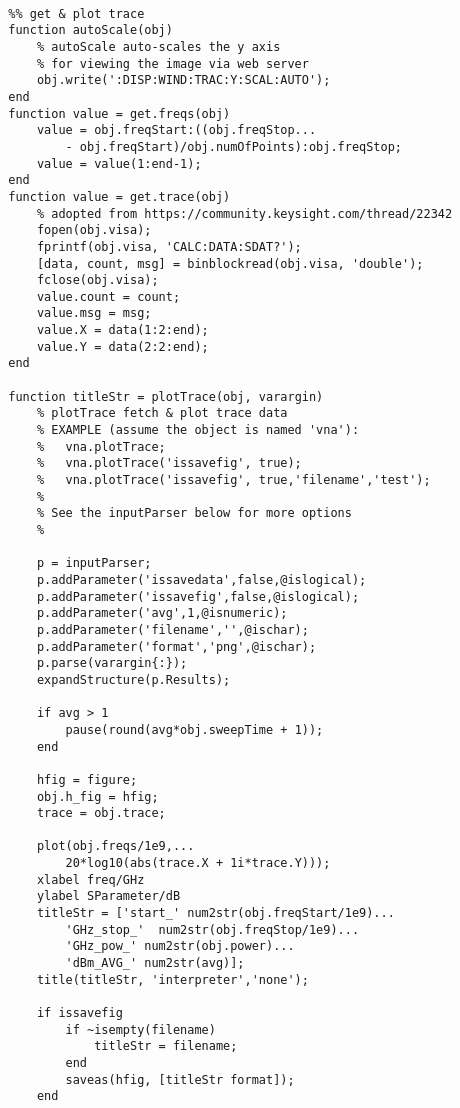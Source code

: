 \begin{lstlisting}
        
        %% get & plot trace
        function autoScale(obj)
            % autoScale auto-scales the y axis
            % for viewing the image via web server
            obj.write(':DISP:WIND:TRAC:Y:SCAL:AUTO');
        end
        function value = get.freqs(obj)            
            value = obj.freqStart:((obj.freqStop...
                - obj.freqStart)/obj.numOfPoints):obj.freqStop;
            value = value(1:end-1);
        end
        function value = get.trace(obj)
            % adopted from https://community.keysight.com/thread/22342
            fopen(obj.visa);
            fprintf(obj.visa, 'CALC:DATA:SDAT?'); 
            [data, count, msg] = binblockread(obj.visa, 'double'); 
            fclose(obj.visa);
            value.count = count;
            value.msg = msg;
            value.X = data(1:2:end); 
            value.Y = data(2:2:end);
        end
        
        function titleStr = plotTrace(obj, varargin)
            % plotTrace fetch & plot trace data
            % EXAMPLE (assume the object is named 'vna'):
            %   vna.plotTrace;
            %   vna.plotTrace('issavefig', true);
            %   vna.plotTrace('issavefig', true,'filename','test');
            %
            % See the inputParser below for more options
            %   
            
            p = inputParser;
            p.addParameter('issavedata',false,@islogical);
            p.addParameter('issavefig',false,@islogical);
            p.addParameter('avg',1,@isnumeric);
            p.addParameter('filename','',@ischar);
            p.addParameter('format','png',@ischar);
            p.parse(varargin{:});
            expandStructure(p.Results);
            
            if avg > 1
                pause(round(avg*obj.sweepTime + 1));
            end
            
            hfig = figure;
            obj.h_fig = hfig;
            trace = obj.trace;
            
            plot(obj.freqs/1e9,...
                20*log10(abs(trace.X + 1i*trace.Y)));
            xlabel freq/GHz
            ylabel SParameter/dB
            titleStr = ['start_' num2str(obj.freqStart/1e9)...
                'GHz_stop_'  num2str(obj.freqStop/1e9)...
                'GHz_pow_' num2str(obj.power)...
                'dBm_AVG_' num2str(avg)];
            title(titleStr, 'interpreter','none');
            
            if issavefig
                if ~isempty(filename)
                    titleStr = filename;
                end
                saveas(hfig, [titleStr format]);
            end
            

\end{lstlisting}
